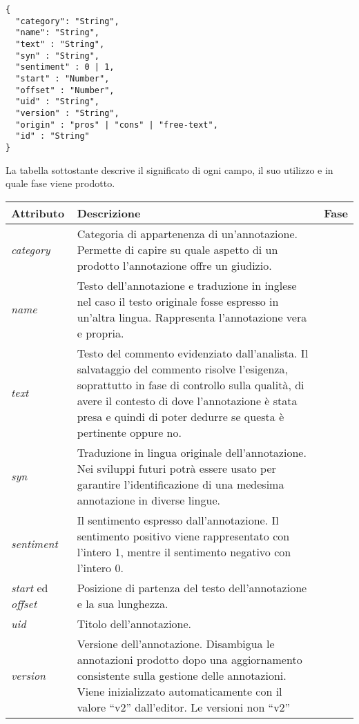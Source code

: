 \begin{center}
\begin{lstlisting}[frame=single]
{
  "category": "String",
  "name": "String",
  "text" : "String",
  "syn" : "String",
  "sentiment" : 0 | 1,
  "start" : "Number",
  "offset" : "Number",
  "uid" : "String",
  "version" : "String",
  "origin" : "pros" | "cons" | "free-text",
  "id" : "String"
}
\end{lstlisting}
\label{snippet_annotation_review}
\end{center}

La tabella sottostante descrive il significato di ogni campo, il suo utilizzo e
in quale fase viene prodotto.

\begin{center}
\begin{longtable}{|>{\centering}p{2.2cm}|p{8cm}|>{\centering}p{2.5cm}|}
\hline
\textbf{Attributo} & \textbf{Descrizione} & \textbf{Fase} \tabularnewline \hline
\textit{category} &
Categoria di appartenenza di un'annotazione. Permette di capire su quale
aspetto di un prodotto l'annotazione offre un giudizio. &
\nameref{catalogarla} \tabularnewline \hline
\textit{name} &
Testo dell'annotazione e traduzione in inglese nel caso il testo originale
fosse espresso in un'altra lingua. Rappresenta l'annotazione vera e propria. &
\nameref{riassumerla} \tabularnewline \hline
\textit{text} &
Testo del commento evidenziato dall'analista. Il salvataggio del commento
risolve l'esigenza, soprattutto in fase di controllo sulla qualità, di avere il
contesto di dove l'annotazione è stata presa e quindi di poter dedurre se questa
è pertinente oppure no. &
\nameref{evidenziarla} \tabularnewline \hline
\textit{syn} &
Traduzione in lingua originale dell'annotazione. Nei sviluppi futuri potrà
essere usato per garantire l'identificazione di una medesima annotazione in
diverse lingue. &
\nameref{riassumerla} \tabularnewline \hline
\textit{sentiment} &
Il sentimento espresso dall'annotazione. Il sentimento positivo viene
rappresentato con l'intero 1, mentre il sentimento negativo con l'intero 0. &
\nameref{sentimento} \tabularnewline \hline
\textit{start} ed \textit{offset} &
Posizione di partenza del testo dell'annotazione e la sua lunghezza. &
\nameref{evidenziarla} \tabularnewline \hline
\textit{uid} &
Titolo dell'annotazione. &
\nameref{intitolarla} \tabularnewline \hline
\textit{version} &
Versione dell'annotazione. Disambigua le annotazioni prodotto dopo una
aggiornamento consistente sulla gestione delle annotazioni. Viene inizializzato
automaticamente con il valore ``v2'' dall'editor. Le versioni non ``v2''

\end{longtable}
\end{center}
